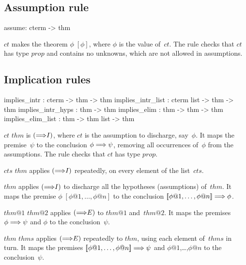\subsection{Assumption rule}
\begin{ttbox} 
assume: cterm -> thm
\end{ttbox}
\begin{ttdescription}
\item[\ttindexbold{assume} $ct$] 
makes the theorem \(\phi \;[\phi]\), where $\phi$ is the value of~$ct$.
The rule checks that $ct$ has type $prop$ and contains no unknowns, which
are not allowed in assumptions.
\end{ttdescription}

\subsection{Implication rules}
\begin{ttbox} 
implies_intr      : cterm -> thm -> thm
implies_intr_list : cterm list -> thm -> thm
implies_intr_hyps : thm -> thm
implies_elim      : thm -> thm -> thm
implies_elim_list : thm -> thm list -> thm
\end{ttbox}
\begin{ttdescription}
\item[\ttindexbold{implies_intr} $ct$ $thm$] 
is $({\Longrightarrow}I)$, where $ct$ is the assumption to discharge, say~$\phi$.  It
maps the premise~$\psi$ to the conclusion $\phi\Longrightarrow\psi$, removing all
occurrences of~$\phi$ from the assumptions.  The rule checks that $ct$ has
type $prop$. 

\item[\ttindexbold{implies_intr_list} $cts$ $thm$] 
applies $({\Longrightarrow}I)$ repeatedly, on every element of the list~$cts$.

\item[\ttindexbold{implies_intr_hyps} $thm$] 
applies $({\Longrightarrow}I)$ to discharge all the hypotheses (assumptions) of~$thm$.
It maps the premise $\phi \; [\phi@1,\ldots,\phi@n]$ to the conclusion
$\List{\phi@1,\ldots,\phi@n}\Imp\phi$.

\item[\ttindexbold{implies_elim} $thm@1$ $thm@2$] 
applies $({\Longrightarrow}E)$ to $thm@1$ and~$thm@2$.  It maps the premises $\phi\Longrightarrow
\psi$ and $\phi$ to the conclusion~$\psi$.

\item[\ttindexbold{implies_elim_list} $thm$ $thms$] 
applies $({\Longrightarrow}E)$ repeatedly to $thm$, using each element of~$thms$ in
turn.  It maps the premises $\List{\phi@1,\ldots,\phi@n}\Imp\psi$ and
$\phi@1$,\ldots,$\phi@n$ to the conclusion~$\psi$.
\end{ttdescription}

